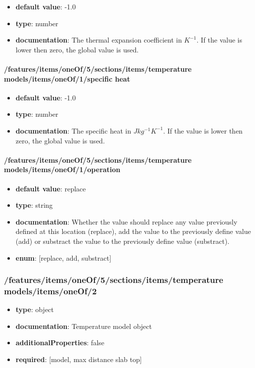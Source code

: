 \begin{itemize}\item {\bf default value}: -1.0
\item {\bf type}: number
\item {\bf documentation}: The thermal expansion coefficient in $K^{-1}$. If the value is lower then zero, the global value is used.
\end{itemize}\paragraph{/features/items/oneOf/5/sections/items/temperature models/items/oneOf/1/specific heat}
\begin{itemize}\item {\bf default value}: -1.0
\item {\bf type}: number
\item {\bf documentation}: The specific heat in $J kg^{-1} K^{-1}$. If the value is lower then zero, the global value is used.
\end{itemize}\paragraph{/features/items/oneOf/5/sections/items/temperature models/items/oneOf/1/operation}
\begin{itemize}\item {\bf default value}: replace
\item {\bf type}: string
\item {\bf documentation}: Whether the value should replace any value previously defined at this location (replace), add the value to the previously define value (add) or substract the value to the previously define value (substract).
\item {\bf enum}: [replace, add, substract]\end{itemize}\subsubsection{/features/items/oneOf/5/sections/items/temperature models/items/oneOf/2}
\begin{itemize}\item {\bf type}: object
\item {\bf documentation}: Temperature model object
\item {\bf additionalProperties}: false
\item {\bf required}: [model, max distance slab top]\end{itemize}
